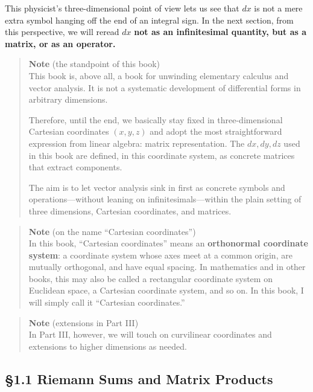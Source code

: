 \documentclass[a4paper,12pt,openany]{book}
\begin{document}
This physicist's three-dimensional point of view lets us see that \(dx\)
is not a mere extra symbol hanging off the end of an integral sign. In
the next section, from this perspective, we will reread \(dx\)
\textbf{not as an infinitesimal quantity, but as a matrix, or as an operator.}

\begin{quote}
\textbf{Note} (the standpoint of this book)\\
This book is, above all, a book for unwinding elementary calculus and
vector analysis. It is not a systematic development of differential
forms in arbitrary dimensions.

Therefore, until the end, we basically stay fixed in three-dimensional
Cartesian coordinates \((x,y,z)\) and adopt the most straightforward
expression from linear algebra: matrix representation. The \(dx,dy,dz\)
used in this book are defined, in this coordinate system, as concrete
matrices that extract components.

The aim is to let vector analysis sink in first as concrete symbols and
operations—without leaning on infinitesimals—within the plain
setting of three dimensions, Cartesian coordinates, and matrices.
\end{quote}

\begin{quote}
\textbf{Note} (on the name ``Cartesian coordinates'')\\
In this book, ``Cartesian coordinates'' means an
\textbf{orthonormal coordinate system}: a coordinate system whose axes
meet at a common origin, are mutually orthogonal, and have equal
spacing. In mathematics and in other books, this may also be called a
rectangular coordinate system on Euclidean space, a Cartesian coordinate
system, and so on. In this book, I will simply call it ``Cartesian
coordinates.''
\end{quote}

\begin{quote}
\textbf{Note} (extensions in Part III)\\
In Part III, however, we will touch on curvilinear coordinates and
extensions to higher dimensions as needed.
\end{quote}

\par\vspace{0.35em}\par

\hypertarget{riemann-sums-and-matrix-products}{%
\subsection{§1.1 Riemann Sums and Matrix
Products}\label{riemann-sums-and-matrix-products}}
\end{document}
